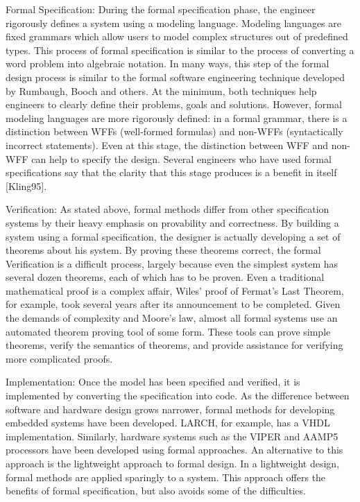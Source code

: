 Formal Specification: During the formal specification phase, the engineer rigorously defines a system using a modeling language. Modeling languages are fixed grammars which allow users to model complex structures out of predefined types. This process of formal specification is similar to the process of converting a word problem into algebraic notation.
In many ways, this step of the formal design process is similar to the formal software engineering technique developed by Rumbaugh, Booch and others. At the minimum, both techniques help engineers to clearly define their problems, goals and solutions. However, formal modeling languages are more rigorously defined: in a formal grammar, there is a distinction between WFFs (well-formed formulas) and non-WFFs (syntactically incorrect statements). Even at this stage, the distinction between WFF and non-WFF can help to specify the design. Several engineers who have used formal specifications say that the clarity that this stage produces is a benefit in itself [Kling95].

Verification: As stated above, formal methods differ from other specification systems by their heavy emphasis on provability and correctness. By building a system using a formal specification, the designer is actually developing a set of theorems about his system. By proving these theorems correct, the formal
Verification is a difficult process, largely because even the simplest system has several dozen theorems, each of which has to be proven. Even a traditional mathematical proof is a complex affair, Wiles' proof of Fermat's Last Theorem, for example, took several years after its announcement to be completed. Given the demands of complexity and Moore's law, almost all formal systems use an automated theorem proving tool of some form. These tools can prove simple theorems, verify the semantics of theorems, and provide assistance for verifying more complicated proofs.

Implementation: Once the model has been specified and verified, it is implemented by converting the specification into code. As the difference between software and hardware design grows narrower, formal methods for developing embedded systems have been developed. LARCH, for example, has a VHDL implementation. Similarly, hardware systems such as the VIPER and AAMP5 processors have been developed using formal approaches.
An alternative to this approach is the lightweight approach to formal design. In a lightweight design, formal methods are applied sparingly to a system. This approach offers the benefits of formal specification, but also avoids some of the difficulties.


